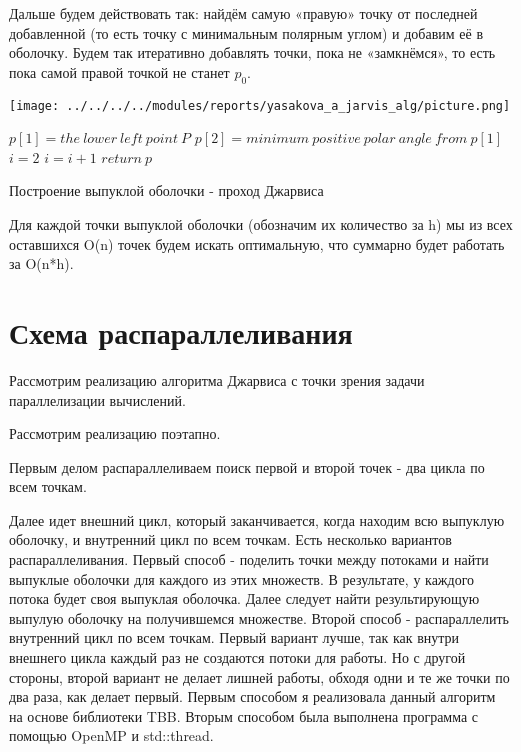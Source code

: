 \documentclass{article}
\newenvironment{myalgorithm}[1][htb]
{\renewcommand{\algorithmcfname}{Алгоритм}
\begin{algorithm}[#1]%
}{\end{algorithm}}
\begin{document}
\par Дальше будем действовать так: найдём самую «правую» точку от последней добавленной (то есть точку с минимальным полярным углом) и добавим её в оболочку. Будем так итеративно добавлять точки, пока не «замкнёмся», то есть пока самой правой точкой не станет $p_{0}$.

\begin{center}
\captionsetup {type = figure}
\texttt{[image: ../../../../modules/reports/yasakova\_a\_jarvis\_alg/picture.png]}
\vspace{1ex}
\end{center}

\begin{myalgorithm}[H]
\SetAlgoLined
\BlankLine
$p[1] = the\:lower\:left\:point\:P$\;
$p[2] =minimum\:positive\:polar\:angle\:from\:p[1]$\;
$i = 2$\;
\BlankLine
{} {
$i = i + 1$\;
}
$return\:p$\;
\caption{Построение выпуклой оболочки - проход Джарвиса}
\end{myalgorithm}

\par Для каждой точки выпуклой оболочки (обозначим их количество за
h) мы из всех оставшихся O(n) точек будем искать оптимальную, что
суммарно будет работать за O(n*h).

\newpage

\section{Схема распараллеливания}
Рассмотрим реализацию алгоритма Джарвиса с точки зрения задачи параллелизации вычислений.

\par Рассмотрим реализацию поэтапно.
\par Первым делом распараллеливаем поиск первой и второй точек - два цикла по всем точкам.
\par Далее идет внешний цикл, который заканчивается, когда находим всю выпуклую оболочку, и внутренний цикл по всем точкам. Есть несколько вариантов распараллеливания. Первый способ - поделить точки между потоками и найти выпуклые оболочки для каждого из этих множеств. В результате, у каждого потока будет своя выпуклая оболочка. Далее следует найти результирующую выпулую оболочку на получившемся множестве. Второй способ - распараллелить внутренний цикл по всем точкам. Первый вариант лучше, так как внутри внешнего цикла каждый раз не создаются потоки для работы. Но с другой стороны, второй вариант не делает лишней работы, обходя одни и те же точки по два раза, как делает первый. Первым способом я реализовала данный алгоритм на основе библиотеки TBB. Вторым способом была выполнена программа с помощью OpenMP и std::thread.
\end{document}
